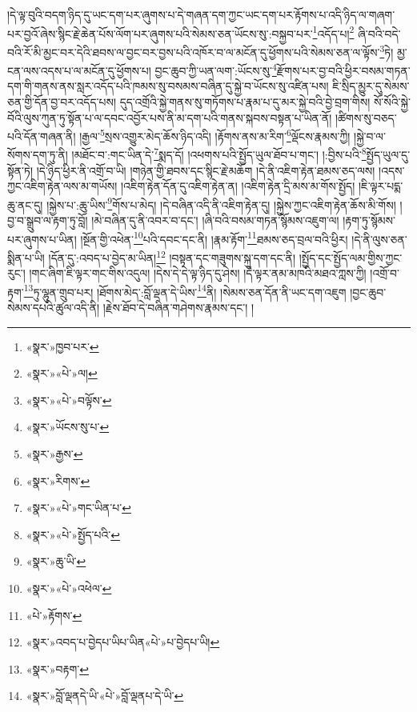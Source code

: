 །དེ་ལྟ་བུའི་བདག་ཉིད་དུ་ཡང་དག་པར་ཞུགས་པ་དེ་གཞན་དག་ཀྱང་ཡང་དག་པར་རྟོགས་པ་འདི་ཉིད་ལ་གཞག་པར་བྱའོ་ཞེས་སྙིང་རྗེ་ཆེན་པོས་ལོག་པར་ཞུགས་པའི་སེམས་ཅན་ཡོངས་སུ་:བསྐྱབ་པར་\footnote{«སྣར་»ཁྱབ་པར་}འདོད་པ།\footnote{«སྣར་»«པེ་»ལ།} ཞི་བའི་བདེ་བའི་རོ་མི་མྱང་བར་དེའི་ཐབས་ལ་བྱང་བར་བྱས་པའི་འཁོར་བ་ལ་མངོན་དུ་ཕྱོགས་པའི་སེམས་ཅན་ལ་ལྟོས་\footnote{«སྣར་»«པེ་»བལྟོས་}ཏེ། མྱ་ངན་ལས་འདས་པ་ལ་མངོན་དུ་ཕྱོགས་པ། བྱང་ཆུབ་ཀྱི་ཡན་ལག་:ཡོངས་སུ་\footnote{«སྣར་»ཡོངས་སུ་པ་}རྫོགས་པར་བྱ་བའི་ཕྱིར་བསམ་གཏན་དག་གི་གནས་ནས་སླར་འདོད་པའི་ཁམས་སུ་བསམས་བཞིན་དུ་སྐྱེ་བ་ཡོངས་སུ་འཛིན་པས། ཇི་སྲིད་མྱུར་དུ་སེམས་ཅན་གྱི་དོན་བྱ་བར་འདོད་པས། དུད་འགྲོའི་སྐྱེ་གནས་སུ་གཏོགས་པ་རྣམ་པ་དུ་མར་སྐྱེ་བའི་བྱེ་བྲག་གིས། སོ་སོའི་སྐྱེ་བོའི་ལུས་ཀུན་ཏུ་སྟོན་པ་ལ་དབང་འབྱོར་པས་ནི་མ་དག་པའི་གནས་སྐབས་བསྟན་པ་ཡིན་ནོ། །ཚིགས་སུ་བཅད་པའི་དོན་གཞན་ནི། །རྒྱལ་\footnote{«སྣར་»རྒྱས་}སྲས་འགྱུར་མེད་ཆོས་ཉིད་འདི། །རྟོགས་ནས་མ་རིག་\footnote{«སྣར་»རིགས་}ལྡོངས་རྣམས་ཀྱི། །སྐྱེ་བ་ལ་སོགས་དག་ཏུ་ནི། །མཐོང་བ་:གང་ཡིན་དེ་\footnote{«སྣར་»«པེ་»གང་ཡིན་པ་}སྨད་དོ། །འཕགས་པའི་སྤྱོད་ཡུལ་ཐོབ་པ་གང་། །:བྱིས་པའི་\footnote{«སྣར་»«པེ་»སྤྱོད་པའི་}སྤྱོད་ཡུལ་དུ་སྟོན་ཏེ། །དེ་ཉིད་ཕྱིར་ནི་འགྲོ་བ་ཡི། །གཉེན་གྱི་ཐབས་དང་སྙིང་རྗེ་མཆོག །དེ་ནི་འཇིག་རྟེན་ཐམས་ཅད་ལས། །འདས་ཀྱང་འཇིག་རྟེན་ལས་མ་གཡོས། །འཇིག་རྟེན་དོན་དུ་འཇིག་རྟེན་ན། །འཇིག་རྟེན་དྲི་མས་མ་གོས་སྤྱོད། །ཇི་ལྟར་པདྨ་ཆུ་ནང་དུ། །སྐྱེས་པ་:ཆུ་ཡིས་\footnote{«སྣར་»ཆུ་ཡི་}གོས་པ་མེད། །དེ་བཞིན་འདི་ནི་འཇིག་རྟེན་དུ། །སྐྱེས་ཀྱང་འཇིག་རྟེན་ཆོས་མི་གོས། །བྱ་བ་སྒྲུབ་ལ་རྟག་ཏུ་བློ། །མེ་བཞིན་དུ་ནི་འབར་བ་དང་། །ཞི་བའི་བསམ་གཏན་སྙོམས་འཇུག་ལ། །རྟག་ཏུ་སྙོམས་པར་ཞུགས་པ་ཡིན། །སྔོན་གྱི་འཕེན་\footnote{«སྣར་»«པེ་»འཕེལ་}པའི་དབང་དང་ནི། །རྣམ་རྟོག་\footnote{«པེ་»རྟོགས་}ཐམས་ཅད་བྲལ་བའི་ཕྱིར། །དེ་ནི་ལུས་ཅན་སྨིན་པ་ཡི། །དོན་དུ་:འབད་པ་བྱེད་མ་ཡིན།\footnote{«སྣར་»འབད་པ་བྱེདཔ་ཡིཔ་ཡིན«པེ་»པ་བྱེདཔ་ཡི།} །བསྟན་དང་གཟུགས་སྐུ་དག་དང་ནི། །སྤྱོད་དང་སྤྱོད་ལམ་གྱིས་ཀྱང་རུང་། །གང་ཞིག་ཇི་ལྟར་གང་གིས་འདུལ། །དེས་དེ་དེ་ལྟ་ཉིད་དུ་ཤེས། །དེ་ལྟར་ནམ་མཁའི་མཐའ་ཀླས་ཀྱི། །འགྲོ་བ་རྟག་\footnote{«སྣར་»བརྟག་}ཏུ་ལྷུན་གྲུབ་པར། །ཐོགས་མེད་:བློ་ལྡན་དེ་ཡིས་\footnote{«སྣར་»བློ་ལྡནདེ་ཡི་«པེ་»བློ་ལྡནཔ་དེ་ཡི་}ནི། །སེམས་ཅན་དོན་ནི་ཡང་དག་འཇུག །བྱང་ཆུབ་སེམས་དཔའི་ཚུལ་འདི་ནི། །རྗེས་ཐོབ་དེ་བཞིན་གཤེགས་རྣམས་དང་། །
